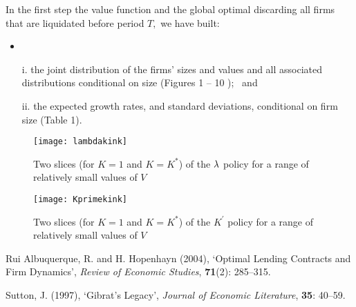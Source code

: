 \documentclass[12pt]{article}
\begin{document}
\noindent In the first step the value function and the global optimal
discarding all firms that are liquidated before period $%
T,$ we have built:

\begin{itemize}
\item %

\item[i.] the joint distribution of the firms' sizes and values and all
associated distributions conditional on size (Figures 1 -- 10 ); \, and

\item[ii.] the expected growth rates, and standard deviations, conditional
on firm size (Table 1).
\end{itemize}

\begin{figure}[]
\center
\texttt{[image: lambdakink]}
\caption{Two slices (for $K=1$ and $K=K^*$) of the $\protect\lambda$ policy
for a range of relatively small values of $V$}
\label{fig:figpolicylambda}
\end{figure}

\begin{figure}[]
\center
\texttt{[image: Kprimekink]}
\caption{Two slices (for $K=1$ and $K=K^*$) of the $K^{\prime }$ policy for
a range of relatively small values of $V$}
\label{fig:figpolicyKprime}
\end{figure}

\newpage

\begin{thebibliography}{99}
 Rui Albuquerque, R. and H. Hopenhayn (2004), `Optimal
Lending Contracts and Firm Dynamics', \emph{Review of Economic Studies}, 
\textbf{71}(2): 285--315.

 Sutton, J. (1997), `Gibrat's Legacy', \emph{Journal of
Economic Literature}, \textbf{35}: 40--59.
\end{thebibliography}
\end{document}
